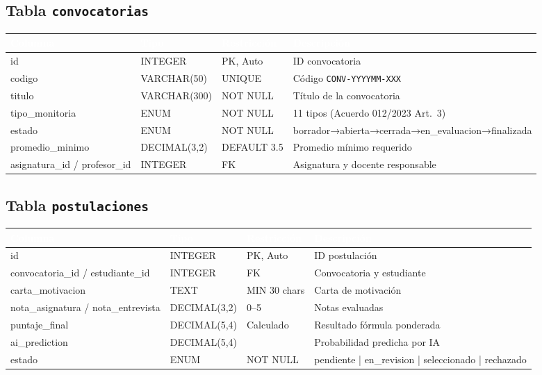 \documentclass[12pt,a4paper,twoside]{report}
\begin{document}
\subsection{Tabla \texttt{convocatorias}}
\begin{center}
\begin{tabularx}{\textwidth}{|l|l|l|X|}
\hline
\rowcolor{tableHdr}
\textcolor{white}{\textbf{Columna}} & \textcolor{white}{\textbf{Tipo}} &
\textcolor{white}{\textbf{Restricción}} & \textcolor{white}{\textbf{Descripción}} \\
\hline
\rowcolor{rowOdd}id & INTEGER & PK, Auto & ID convocatoria \\
\hline\rowcolor{rowEven}codigo & VARCHAR(50) & UNIQUE & Código \texttt{CONV-YYYYMM-XXX} \\
\hline\rowcolor{rowOdd}titulo & VARCHAR(300) & NOT NULL & Título de la convocatoria \\
\hline\rowcolor{rowEven}tipo\_monitoria & ENUM & NOT NULL & 11 tipos (Acuerdo 012/2023 Art.~3) \\
\hline\rowcolor{rowOdd}estado & ENUM & NOT NULL & borrador→abierta→cerrada→en\_evaluacion→finalizada \\
\hline\rowcolor{rowEven}promedio\_minimo & DECIMAL(3,2) & DEFAULT 3.5 & Promedio mínimo requerido \\
\hline\rowcolor{rowOdd}asignatura\_id / profesor\_id & INTEGER & FK & Asignatura y docente responsable \\
\hline
\end{tabularx}
\end{center}

\subsection{Tabla \texttt{postulaciones}}
\begin{center}
\begin{tabularx}{\textwidth}{|l|l|l|X|}
\hline
\rowcolor{tableHdr}
\textcolor{white}{\textbf{Columna}} & \textcolor{white}{\textbf{Tipo}} &
\textcolor{white}{\textbf{Restricción}} & \textcolor{white}{\textbf{Descripción}} \\
\hline
\rowcolor{rowOdd}id & INTEGER & PK, Auto & ID postulación \\
\hline\rowcolor{rowEven}convocatoria\_id / estudiante\_id & INTEGER & FK & Convocatoria y estudiante \\
\hline\rowcolor{rowOdd}carta\_motivacion & TEXT & MIN 30 chars & Carta de motivación \\
\hline\rowcolor{rowEven}nota\_asignatura / nota\_entrevista & DECIMAL(3,2) & 0--5 & Notas evaluadas \\
\hline\rowcolor{rowOdd}puntaje\_final & DECIMAL(5,4) & Calculado & Resultado fórmula ponderada \\
\hline\rowcolor{rowEven}ai\_prediction & DECIMAL(5,4) & & Probabilidad predicha por IA \\
\hline\rowcolor{rowOdd}estado & ENUM & NOT NULL & pendiente | en\_revision | seleccionado | rechazado \\
\hline
\end{tabularx}
\end{center}
\end{document}
